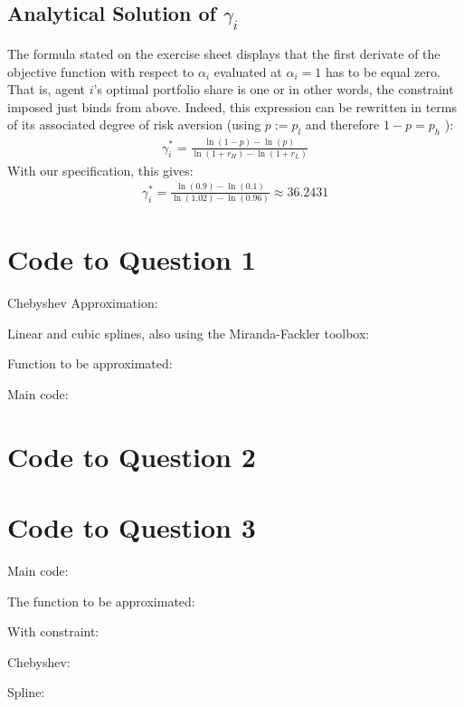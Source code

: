 \documentclass{article}
\begin{document}
\subsection{Analytical Solution of $\gamma_i$}
The formula stated on the exercise sheet displays that the first derivate of the objective function with respect to $\alpha_i$ evaluated at $\alpha_i=1$ has to be equal zero. That is, agent $i$'s optimal portfolio share is one or in other words, the constraint imposed just binds from above. Indeed, this expression can be rewritten in terms of its associated degree of risk aversion (using $p:=p_l$ and therefore  $1-p=p_h$ ): \begin{align*}
\gamma_i^*=\frac{\ln{(1-p)}-\ln{(p)}}{\ln {(1+r_H)}-\ln {(1+r_L)}}
\end{align*}
With our specification, this gives:
 \begin{align*}
\gamma_i^*=\frac{\ln{(0.9)}-\ln{(0.1)}}{\ln {(1.02)}-\ln {(0.96)}} \approx 36.2431
\end{align*}
\newpage
\begin{appendices}
\section{Code to Question 1}
Chebyshev Approximation:

Linear and cubic splines, also using the Miranda-Fackler toolbox:

Function to be approximated:

Main code:

\section{Code to Question 2}

\section{Code to Question 3}
Main code:

The function to be approximated:

With constraint:

Chebyshev:

Spline:

\end{appendices}
\end{document}
